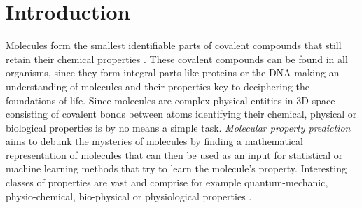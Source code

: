 \section{Introduction}\label{sec:inttroduction}
\noindent Molecules form the smallest identifiable parts of covalent compounds that still retain their chemical properties \cite{molecules}. These covalent compounds can be found in all organisms, since they form integral parts like proteins or the DNA making an understanding of molecules and their properties key to deciphering the foundations of life. Since molecules are complex physical entities in 3D space consisting of covalent bonds between atoms identifying their chemical, physical or biological properties is by no means a simple task. \emph{Molecular property prediction} aims to debunk the mysteries of molecules by finding a mathematical representation of molecules that can then be used as an input for statistical or machine learning methods that try to learn the molecule's property. Interesting classes of properties are vast and comprise for example quantum-mechanic, physio-chemical, bio-physical or physiological properties \cite{wu2018moleculenet}.